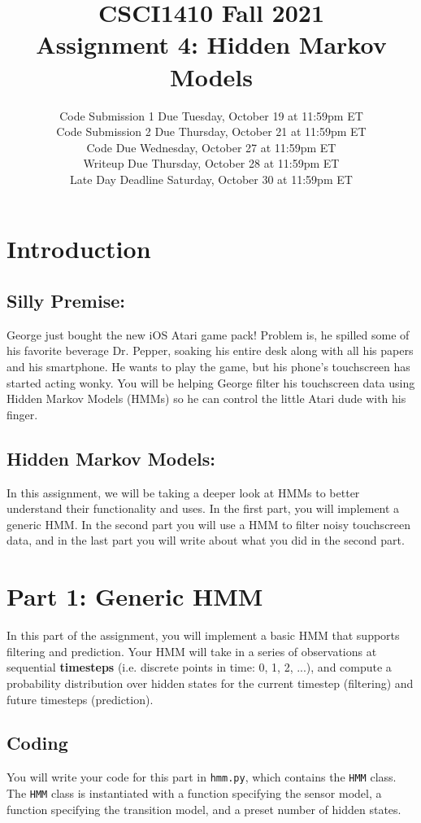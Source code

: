 \documentclass{article}
\title{CSCI1410 Fall 2021 \\
Assignment 4: Hidden Markov Models}
\date{%
Code Submission 1 Due Tuesday, October 19 at 11:59pm ET\\ [1ex]
Code Submission 2 Due Thursday, October 21 at 11:59pm ET\\ [1ex]
Code Due Wednesday, October 27 at 11:59pm ET\\ [1ex]
Writeup Due Thursday, October 28 at 11:59pm ET\\ [1ex]
Late Day Deadline Saturday, October 30 at 11:59pm ET
}
\author{}
\begin{document}
\maketitle

\section*{Introduction}

\subsection*{Silly Premise:}
George just bought the new iOS Atari game pack! Problem is, he spilled some of his favorite beverage Dr. Pepper, soaking his entire desk along with all his papers and his smartphone. He wants to play the game, but his phone's touchscreen has started acting wonky. You will be helping George filter his touchscreen data using Hidden Markov Models (HMMs) so he can control the little Atari dude with his finger.

\subsection*{Hidden Markov Models:}
In this assignment, we will be taking a deeper look at HMMs to better understand their functionality and uses. In the first part, you will implement a generic HMM. In the second part you will use a HMM to filter noisy touchscreen data, and in the last part you will write about what you did in the second part.

\section{Part 1: Generic HMM}
In this part of the assignment, you will implement a basic HMM that supports filtering and prediction. Your HMM will take in a series of observations at sequential \textbf{timesteps} (i.e. discrete points in time: 0, 1, 2, ...), and compute a probability distribution over hidden states for the current timestep (filtering) and future timesteps (prediction).

\subsection{Coding}
You will write your code for this part in \texttt{hmm.py}, which contains the \texttt{HMM} class. The \texttt{HMM} class is instantiated with a function specifying the sensor model, a function specifying the transition model, and a preset number of hidden states.
\end{document}
